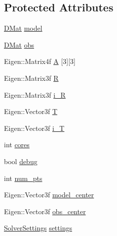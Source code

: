 \subsection*{\-Protected \-Attributes}
\begin{DoxyCompactItemize}
\item 
\hyperlink{common_8h_a4ec92c19d079ab17709ca464cfb8e5bd}{\-D\-Mat} \hyperlink{classPoseEstimate_aca9217cfe0d272f172f65adfc31764f1}{model}
\item 
\hyperlink{common_8h_a4ec92c19d079ab17709ca464cfb8e5bd}{\-D\-Mat} \hyperlink{classPoseEstimate_a75beb14fe9fd10fc8a80eff84f348c1c}{obs}
\item 
\-Eigen\-::\-Matrix4f \hyperlink{classPoseEstimate_ad4827d1aca3b4730d6e8c0cf4e96deca}{\-A} \mbox{[}3\mbox{]}\mbox{[}3\mbox{]}
\item 
\-Eigen\-::\-Matrix3f \hyperlink{classPoseEstimate_a45910f753f4c92260252d965af504cc8}{\-R}
\item 
\-Eigen\-::\-Matrix3f \hyperlink{classPoseEstimate_ac6b2c23e4121d00a14d4a8245cad86ab}{i\-\_\-\-R}
\item 
\-Eigen\-::\-Vector3f \hyperlink{classPoseEstimate_a31a1a39ab75efc08a00ddc8f8f75b60b}{\-T}
\item 
\-Eigen\-::\-Vector3f \hyperlink{classPoseEstimate_a0fa85e3f7cd2b447df9985519a28c0d7}{i\-\_\-\-T}
\item 
int \hyperlink{classPoseEstimate_a9b1cbebd4de554e6c0b4607a2a462a92}{cores}
\item 
bool \hyperlink{classPoseEstimate_a81f2cf4c423887225557200a6da5744e}{debug}
\item 
int \hyperlink{classPoseEstimate_a8bad9dfcf6b8ec9e3ba4f62498594524}{num\-\_\-pts}
\item 
\-Eigen\-::\-Vector3f \hyperlink{classPoseEstimate_acd4fefbc3f3fd794f51a8a338996b2ae}{model\-\_\-center}
\item 
\-Eigen\-::\-Vector3f \hyperlink{classPoseEstimate_a3431f3d795bc7e5ec3108c923cf4eb9f}{obs\-\_\-center}
\item 
\hyperlink{structSolverSettings}{\-Solver\-Settings} \hyperlink{classPoseEstimate_ae1d0b8586991b50d575afa6b8bae92da}{settings}
\end{DoxyCompactItemize}


